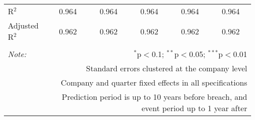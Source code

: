 \begin{table}[!htbp]
\begin{tabular}{@{\extracolsep{5pt}}lccccc}
R$^{2}$ & 0.964 & 0.964 & 0.964 & 0.964 & 0.964 \\ 
Adjusted R$^{2}$ & 0.962 & 0.962 & 0.962 & 0.962 & 0.962 \\ 
\hline 
\hline \\[-1.8ex] 
\textit{Note:}  & \multicolumn{5}{r}{$^{*}$p$<$0.1; $^{**}$p$<$0.05; $^{***}$p$<$0.01} \\ 
 & \multicolumn{5}{r}{Standard errors clustered at the company level} \\ 
 & \multicolumn{5}{r}{Company and quarter fixed effects in all specifications} \\ 
 & \multicolumn{5}{r}{Prediction period is up to 10 years before breach, and event period up to 1 year after} \\ 
\end{tabular} 
\end{table} 
